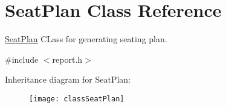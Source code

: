 \hypertarget{classSeatPlan}{\section{Seat\-Plan Class Reference}
\label{classSeatPlan}
}


\hyperlink{classSeatPlan}{Seat\-Plan} C\-Lass for generating seating plan.  




{\ttfamily \#include $<$report.\-h$>$}

Inheritance diagram for Seat\-Plan\-:\begin{figure}[H]
\begin{center}
\leavevmode
\texttt{[image: classSeatPlan]}
\end{center}
\end{figure}
